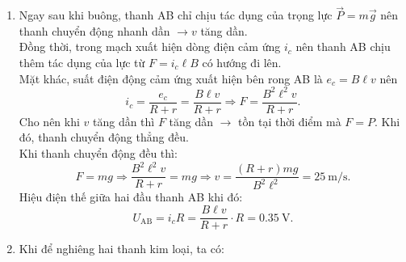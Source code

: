 \begin{vd}
{\begin{enumerate}[label=\alph*)]
\begin{center}
		\end{center}
		\item Ngay sau khi buông, thanh AB chỉ chịu tác dụng của trọng lực $\vec{P}=m\vec{g}$ nên thanh chuyển động nhanh dần $\rightarrow v$ tăng dần.\\
		Đồng thời, trong mạch xuất hiện dòng điện cảm ứng $i_c$ nên thanh AB chịu thêm tác dụng của lực từ $F=i_c\ell B$ có hướng đi lên.\\
		Mặt khác, suất điện động cảm ứng xuất hiện bên rong AB là $e_c=B\ell v$ nên
		$$i_c=\dfrac{e_c}{R+r}=\dfrac{B\ell v}{R+r}\Rightarrow F=\dfrac{B^2\ell^2v}{R+r}.$$
		Cho nên khi $v$ tăng dần thì $F$ tăng dần $\rightarrow$ tồn tại thời điểm mà $F=P$. Khi đó, thanh chuyển động thẳng đều.\\
		Khi thanh chuyển động đều thì:
		$$F=mg\Rightarrow \dfrac{B^2\ell^2v}{R+r}=mg\Rightarrow v=\dfrac{\left(R+r\right)mg}{B^2\ell^2}=\SI{25}{\meter/\second}.$$
		Hiệu điện thế giữa hai đầu thanh AB khi đó:
		$$U_\text{AB}=i_cR=\dfrac{B\ell v}{R+r}\cdot R=\SI{0.35}{\volt}.$$
		\item Khi để nghiêng hai thanh kim loại, ta có:
		\begin{center}
\end{center}
\end{enumerate}}
\end{vd}
